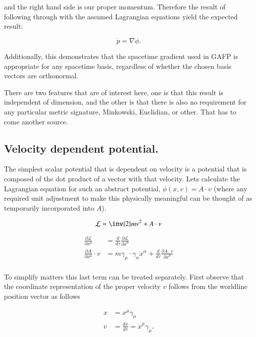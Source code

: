 \documentclass{article}
\newcommand{\grad}[0] {\nabla}
\newcommand{\pdot}[0]{\dot{p}}
\newcommand{\xdot}[0]{\dot{x}}
\begin{document}
and the right hand side is our proper momentum.  Therefore the result of following through with the assumed Lagrangian equations yield the expected result:

\begin{equation}
\pdot = \grad \phi.
\end{equation}

Additionally, this demonstrates that the spacetime gradient used in GAFP is appropriate for any spacetime basis, regardless of whether the chosen basis vectors are orthonormal.

There are two features that are of interest here, one is that this result is independent of dimension, and the other is that there is also no requirement for any particular metric signature, Minkowski, Euclidian, or other.  That has to come another source.

\subsection{ Velocity dependent potential. }

The simplest scalar potential that is dependent on velocity is a potential that is composed of the dot product of a vector with that velocity.  Lets calculate the Lagrangian
equation for such an abstract potential, $\phi(x,v) = A \cdot v$ (where any required unit adjustment to make this physically meaningful can be thought of as temporarily incorporated into $A$).

\begin{equation}
\mathcal{L} = \inv{2}m v^2 + A \cdot v
\end{equation}

\begin{align*}
\frac{\partial \mathcal{L}}{\partial x^{\mu}} &= \frac{d}{d\tau} \frac{\partial \mathcal{L}}{\partial \xdot^{\mu}} \\
\frac{\partial A}{\partial x^{\mu}} \cdot v &= m \gamma_{\mu} \cdot \gamma_{\alpha} \ddot{x}^{\alpha} +\frac{d}{d\tau} \frac{\partial A \cdot v}{\partial \xdot^{\mu}} \\
\end{align*}

To simplify matters this last term can be treated separately.  First observe that the coordinate representation of the proper velocity $v$ follows from the worldline
position vector as follows

\begin{align*}
x &= x^\mu \gamma_\mu \\
v &= \frac{dx}{d\tau} = \xdot^\mu \gamma_\mu.
\end{align*}
\end{document}
